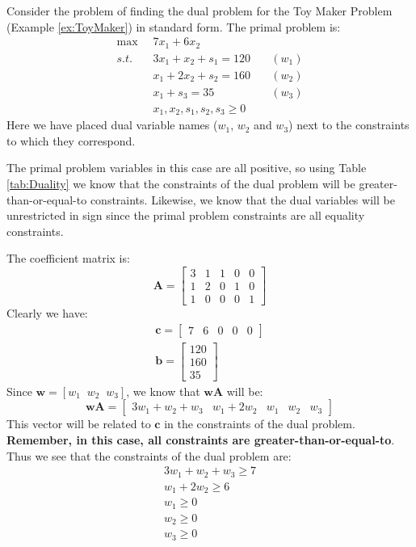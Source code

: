 \begin{example} Consider the problem of finding the dual problem for the Toy Maker Problem (Example \ref{ex:ToyMaker}) in standard form. The primal problem is:
\begin{displaymath}
\begin{aligned}
\max\;\;&7x_1 + 6x_2\\
s.t.\;\;& 3x_1 + x_2 + s_1 = 120\quad & (w_1)\\
& x_1 + 2x_2 + s_2 = 160\quad & (w_2)\\
&x_1 + s_3 = 35\quad & (w_3)\\
&x_1, x_2, s_1, s_2, s_3 \geq 0
\end{aligned}
\end{displaymath}
Here we have placed dual variable names ($w_1$, $w_2$ and $w_3$) next to the constraints to which they correspond. 

The primal problem variables in this case are all positive, so using Table \ref{tab:Duality} we know that the constraints of the dual problem will be greater-than-or-equal-to constraints. Likewise, we know that the dual variables will be unrestricted in sign since the primal problem constraints are all equality constraints.

The coefficient matrix is:
\begin{displaymath}
\mathbf{A} = 
\begin{bmatrix}
3 & 1 & 1 & 0 & 0\\
1 & 2 & 0 & 1 & 0\\
1 & 0 & 0 & 0 & 1
\end{bmatrix}
\end{displaymath}
Clearly we have:
\begin{gather*}
\mathbf{c} = \begin{bmatrix}7 & 6 & 0 & 0 & 0\end{bmatrix}\\
\mathbf{b}= \begin{bmatrix}120 \\160 \\ 35\end{bmatrix}
\end{gather*} 
Since $\mathbf{w} = [w_1 \;\; w_2 \;\; w_3]$, we know that $\mathbf{w}\mathbf{A}$ will be:
\begin{displaymath}
\mathbf{w}\mathbf{A} = 
\begin{bmatrix}
3w_1 + w_2 + w_3 & w_1 + 2w_2 & w_1 & w_2 & w_3
\end{bmatrix}
\end{displaymath}
This vector will be related to $\mathbf{c}$ in the constraints of the dual problem. \textbf{Remember, in this case, all constraints are greater-than-or-equal-to}. Thus we see that the constraints of the dual problem are:
\begin{align*}
3w_1 + w_2 + w_3 \geq 7\\
w_1 + 2w_2 \geq 6\\
w_1 \geq 0\\
w_2 \geq 0\\
w_3 \geq 0 
\end{align*}


\end{example}
